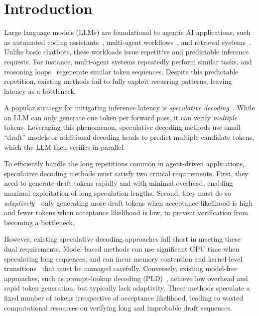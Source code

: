 \section{Introduction}

Large language models (LLMs) are foundational to agentic AI applications, such as automated coding assistants~\citep{wang2025openhandsopenplatformai, yang2024sweagentagentcomputerinterfacesenable}, multi-agent workflows~\citep{wang2024mixtureofagentsenhanceslargelanguage, chen2024autoagentsframeworkautomaticagent}, and retrieval systems~\citep{wang2024speculativeragenhancingretrieval, gao2024retrievalaugmentedgenerationlargelanguage}. Unlike basic chatbots, these workloads issue repetitive and predictable inference requests. For instance, multi-agent systems repeatedly perform similar tasks, and reasoning loops~\citep{wang2023selfconsistencyimproveschainthought, madaan2023selfrefineiterativerefinementselffeedback} regenerate similar token sequences. Despite this predictable repetition, existing methods fail to fully exploit recurring patterns, leaving latency as a bottleneck.

A popular strategy for mitigating inference latency is \emph{speculative decoding}~\citep{leviathan23,chen23,specinfer,cai2024medusasimplellminference, bita, draftverify}. While an LLM can only generate one token per forward pass, it can verify {\em multiple} tokens. Leveraging this phenomenon, speculative decoding methods use small ``draft'' models or additional decoding heads to predict multiple candidate tokens, which the LLM then verifies in parallel.

To efficiently handle the long repetitions common in agent-driven applications, speculative decoding methods must satisfy two critical requirements. First, they need to generate draft tokens rapidly and with minimal overhead, enabling maximal exploitation of long speculation lengths. Second, they must do so \emph{adaptively}---only generating more draft tokens when acceptance likelihood is high and fewer tokens when acceptance likelihood is low, to prevent verification from becoming a bottleneck.

However, existing speculative decoding approaches fall short in meeting these dual requirements. Model-based methods can use significant GPU time when speculating long sequences, and can incur memory contention and kernel-level transitions~\citep{sequoia,eagle2} that must be managed carefully. Conversely, existing model-free approaches, such as prompt-lookup decoding (PLD)~\citep{saxena2023prompt}, achieve low overhead and rapid token generation, but typically lack adaptivity. These methods speculate a fixed number of tokens irrespective of acceptance likelihood, leading to wasted computational resources on verifying long and improbable draft sequences.

